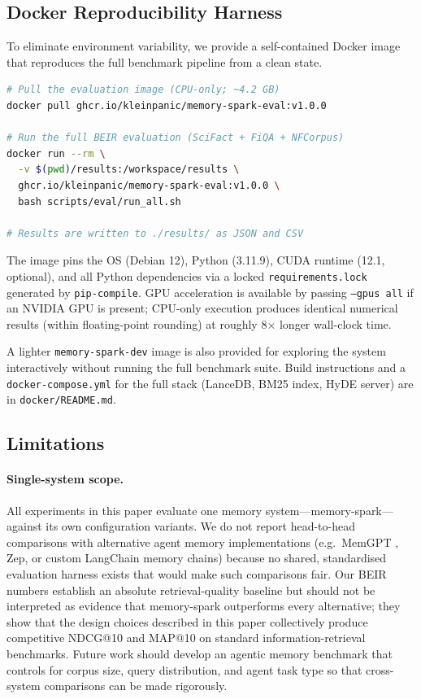 \documentclass[11pt]{article}
\begin{document}
\subsection{Docker Reproducibility Harness}

To eliminate environment variability, we provide a self-contained Docker image
that reproduces the full benchmark pipeline from a clean state.

\begin{lstlisting}[language=bash, caption={Reproducing all benchmark results.}]
# Pull the evaluation image (CPU-only; ~4.2 GB)
docker pull ghcr.io/kleinpanic/memory-spark-eval:v1.0.0

# Run the full BEIR evaluation (SciFact + FiQA + NFCorpus)
docker run --rm \
  -v $(pwd)/results:/workspace/results \
  ghcr.io/kleinpanic/memory-spark-eval:v1.0.0 \
  bash scripts/eval/run_all.sh

# Results are written to ./results/ as JSON and CSV
\end{lstlisting}

The image pins the OS (Debian 12), Python (3.11.9), CUDA runtime (12.1, optional),
and all Python dependencies via a locked \texttt{requirements.lock} generated by
\texttt{pip-compile}.
GPU acceleration is available by passing \texttt{--gpus all} if an NVIDIA GPU is
present; CPU-only execution produces identical numerical results (within
floating-point rounding) at roughly 8$\times$ longer wall-clock time.

A lighter \texttt{memory-spark-dev} image is also provided for exploring the
system interactively without running the full benchmark suite.
Build instructions and a \texttt{docker-compose.yml} for the full stack
(LanceDB, BM25 index, HyDE server) are in \texttt{docker/README.md}.

\subsection{Limitations}
\label{sec:limitations}

\paragraph{Single-system scope.}
All experiments in this paper evaluate one memory system---memory-spark---against
its own configuration variants.
We do not report head-to-head comparisons with alternative agent memory
implementations (e.g.\ MemGPT \citep{packer2023memgpt}, Zep, or custom
LangChain memory chains) because no shared, standardised evaluation harness exists
that would make such comparisons fair.
Our BEIR numbers establish an absolute retrieval-quality baseline but should not
be interpreted as evidence that memory-spark outperforms every alternative;
they show that the design choices described in this paper collectively produce
competitive NDCG@10 and MAP@10 on standard information-retrieval benchmarks.
Future work should develop an agentic memory benchmark that controls for corpus
size, query distribution, and agent task type so that cross-system comparisons
can be made rigorously.
\end{document}
